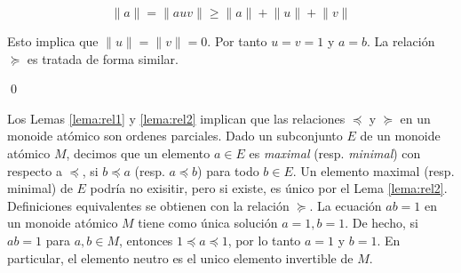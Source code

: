 \documentclass[12pt]{article}
\theoremstyle{definition}
\providecommand{\norm}[1]{\lVert#1\rVert}
\begin{document}
$$\norm{a}=\norm{auv}\geq \norm{a}+\norm{u}+\norm{v}$$

Esto implica que $\norm{u}=\norm{v}=0$. Por tanto $u=v=1$ y $a=b$. La relación $\succeq$ es tratada de forma similar.

\qed

Los Lemas \ref{lema:rel1} y \ref{lema:rel2} implican que las relaciones $\preceq$ y $\succeq$ en un monoide atómico son ordenes parciales. Dado un subconjunto $E$ de un monoide atómico $M$, decimos que un elemento $a\in E$ es \textit{maximal} (resp. \textit{minimal}) con respecto a $\preceq$, si $b\preceq a$ (resp. $a\preceq b$) para todo $b\in E$. Un elemento maximal (resp. minimal) de $E$ podría no exisitir, pero si existe, es único por el Lema \ref{lema:rel2}. Definiciones equivalentes se obtienen con la relación $\succeq$.
\newline
\newline
La ecuación $ab=1$ en un monoide atómico $M$ tiene como única solución $a=1,b=1$. De hecho, si $ab=1$ para $a,b\in M$, entonces $1\preceq a \preceq 1$, por lo tanto $a=1$ y $b=1$. En particular, el elemento neutro es el unico elemento invertible de $M$.
\end{document}
